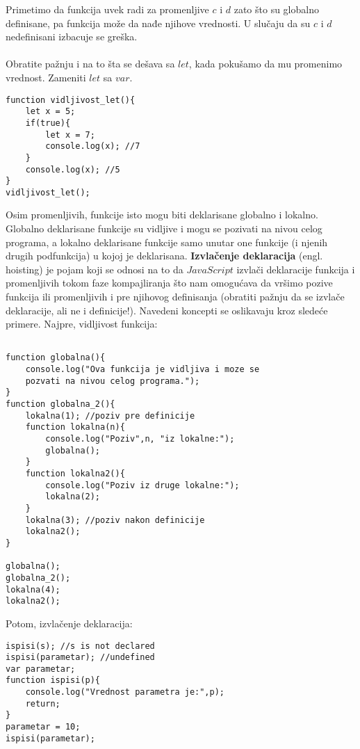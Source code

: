 Primetimo da funkcija uvek radi za promenljive $c$ i $d$ zato što su globalno definisane, pa funkcija može da nađe njihove vrednosti. U slučaju da su $c$ i $d$ nedefinisani izbacuje se greška.\\\\
Obratite pažnju i na to šta se dešava sa $let$, kada pokušamo da mu promenimo vrednost. Zameniti $let$ sa $var$.
\begin{lstlisting}[backgroundcolor = \color{lightgray}, breaklines=true]
function vidljivost_let(){
	let x = 5;
	if(true){
		let x = 7;
		console.log(x); //7
	} 
	console.log(x); //5
}
vidljivost_let();
\end{lstlisting}

Osim promenljivih, funkcije isto mogu biti deklarisane globalno i lokalno. Globalno deklarisane funkcije su vidljive i mogu se pozivati na nivou celog programa, a lokalno deklarisane funkcije samo unutar one funkcije (i njenih drugih podfunkcija) u kojoj je deklarisana. \textbf{Izvlačenje deklaracija} (engl. hoisting) je pojam koji se odnosi na to da $JavaScript$ izvlači deklaracije funkcija i promenljivih tokom faze kompajliranja što nam omogućava da vršimo pozive funkcija ili promenljivih i pre njihovog definisanja (obratiti pažnju da se izvlače deklaracije, ali ne i definicije!). Navedeni koncepti se oslikavaju kroz sledeće primere. Najpre, vidljivost funkcija:

\begin{lstlisting}[backgroundcolor = \color{lightgray}, breaklines=true]

function globalna(){
	console.log("Ova funkcija je vidljiva i moze se 
	pozvati na nivou celog programa.");
}
function globalna_2(){
	lokalna(1); //poziv pre definicije
	function lokalna(n){
		console.log("Poziv",n, "iz lokalne:");
		globalna();
	}
	function lokalna2(){
		console.log("Poziv iz druge lokalne:");
		lokalna(2);
	}
    lokalna(3); //poziv nakon definicije   
    lokalna2();
}

globalna();
globalna_2();
lokalna(4);
lokalna2();
\end{lstlisting}
Potom, izvlačenje deklaracija:
\begin{lstlisting}[backgroundcolor = \color{lightgray}, breaklines=true]
ispisi(s); //s is not declared
ispisi(parametar); //undefined
var parametar;
function ispisi(p){
	console.log("Vrednost parametra je:",p);
    return;
}
parametar = 10; 
ispisi(parametar);
\end{lstlisting}

